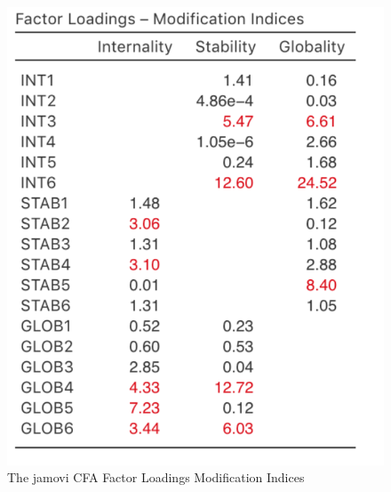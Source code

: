 \documentclass[
]{book}
\begin{document}
\begin{figure}

{\centering \includegraphics[width=1\linewidth]{img/factoranalysis/MTMM8} 

}

\caption{The jamovi CFA Factor Loadings Modification Indices}\label{fig:MTMM8}
\end{figure}
\end{document}
